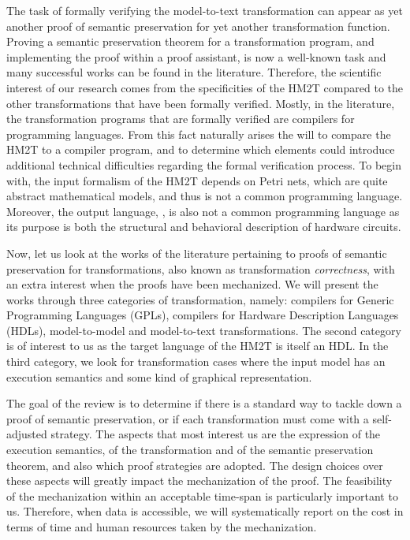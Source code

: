 \documentclass[pdflatex,sn-mathphys]{sn-jnl}%
\theoremstyle{thmstyleone}%
\theoremstyle{thmstyletwo}%
\theoremstyle{thmstylethree}%
\begin{document}
The task of formally verifying the \hilecop{} model-to-text
transformation can appear as yet another proof of semantic
preservation for yet another transformation function. Proving a
semantic preservation theorem for a transformation program, and
implementing the proof within a proof assistant, is now a well-known
task and many successful works can be found in the literature.
Therefore, the scientific interest of our research comes from the
specificities of the HM2T compared to the other transformations that
have been formally verified. Mostly, in the literature, the
transformation programs that are formally verified are compilers for
programming languages. From this fact naturally arises the will to
compare the HM2T to a compiler program, and to determine which
elements could introduce additional technical difficulties regarding
the formal verification process.  To begin with, the input formalism
of the HM2T depends on Petri nets, which are quite abstract
mathematical models, and thus is not a common programming language.
Moreover, the output language, \vhdl{}, is also not a common
programming language as its purpose is both the structural and
behavioral description of hardware circuits.


Now, let us look at the works of the literature pertaining to proofs
of semantic preservation for transformations, also known as
transformation \textit{correctness}, with an extra interest when the
proofs have been mechanized. We will present the works through three
categories of transformation, namely: compilers for Generic
Programming Languages (GPLs), compilers for Hardware Description
Languages (HDLs), model-to-model and model-to-text
transformations. The second category is of interest to us as the
target language of the HM2T is itself an HDL. In the third category,
we look for transformation cases where the input model has an
execution semantics and some kind of graphical representation.


The goal of the review is to determine if there is a standard way to
tackle down a proof of semantic preservation, or if each
transformation must come with a self-adjusted strategy. The aspects
that most interest us are the expression of the execution semantics,
of the transformation and of the semantic preservation theorem, and
also which proof strategies are adopted. The design choices over these
aspects will greatly impact the mechanization of the proof. The
feasibility of the mechanization within an acceptable time-span is
particularly important to us. Therefore, when data is accessible, we
will systematically report on the cost in terms of time and human
resources taken by the mechanization.
\end{document}
